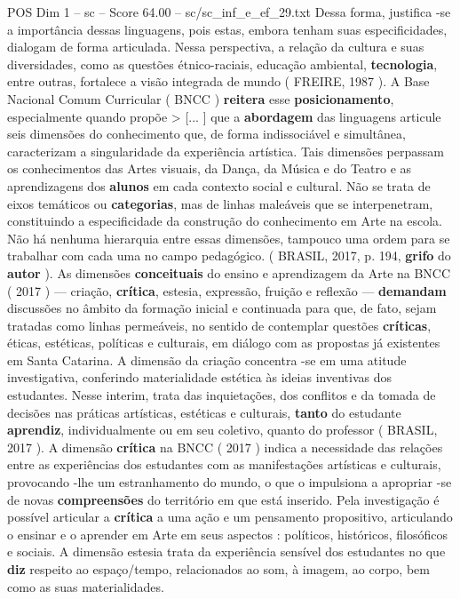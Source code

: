 \begin{textsample}{POS Dim 1 – sc – Score 64.00 – sc/sc\_inf\_e\_ef\_29.txt}
Dessa forma, justifica -se a importância dessas linguagens, pois estas, embora tenham suas especificidades, dialogam de forma articulada.
Nessa perspectiva, a relação da cultura e suas diversidades, como as questões étnico-raciais, educação ambiental, \textbf{tecnologia}, entre outras, fortalece a visão integrada de mundo ( FREIRE, 1987 ).
A Base Nacional Comum Curricular ( BNCC ) \textbf{reitera} esse \textbf{posicionamento}, especialmente quando propõe > [... ] que a \textbf{abordagem} das linguagens articule seis dimensões do conhecimento que, de forma indissociável e simultânea, caracterizam a singularidade da experiência artística.
Tais dimensões perpassam os conhecimentos das Artes visuais, da Dança, da Música e do Teatro e as aprendizagens dos \textbf{alunos} em cada contexto social e cultural.
Não se trata de eixos temáticos ou \textbf{categorias}, mas de linhas maleáveis que se interpenetram, constituindo a especificidade da construção do conhecimento em Arte na escola.
Não há nenhuma hierarquia entre essas dimensões, tampouco uma ordem para se trabalhar com cada uma no campo pedagógico. ( BRASIL, 2017, p. 194, \textbf{grifo} do \textbf{autor} ).
As dimensões \textbf{conceituais} do ensino e aprendizagem da Arte na BNCC ( 2017 ) — criação, \textbf{crítica}, estesia, expressão, fruição e reflexão — \textbf{demandam} discussões no âmbito da formação inicial e continuada para que, de fato, sejam tratadas como linhas permeáveis, no sentido de contemplar questões \textbf{críticas}, éticas, estéticas, políticas e culturais, em diálogo com as propostas já existentes em Santa Catarina.
A dimensão da criação concentra -se em uma atitude investigativa, conferindo materialidade estética às ideias inventivas dos estudantes.
Nesse interim, trata das inquietações, dos conflitos e da tomada de decisões nas práticas artísticas, estéticas e culturais, \textbf{tanto} do estudante \textbf{aprendiz}, individualmente ou em seu coletivo, quanto do professor ( BRASIL, 2017 ).
A dimensão \textbf{crítica} na BNCC ( 2017 ) indica a necessidade das relações entre as experiências dos estudantes com as manifestações artísticas e culturais, provocando -lhe um estranhamento do mundo, o que o impulsiona a apropriar -se de novas \textbf{compreensões} do território em que está inserido.
Pela investigação é possível articular a \textbf{crítica} a uma ação e um pensamento propositivo, articulando o ensinar e o aprender em Arte em seus aspectos : políticos, históricos, filosóficos e sociais.
A dimensão estesia trata da experiência sensível dos estudantes no que \textbf{diz} respeito ao espaço/tempo, relacionados ao som, à imagem, ao corpo, bem como as suas materialidades.

\end{textsample}
